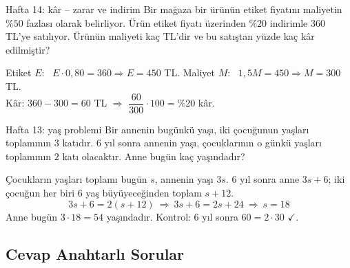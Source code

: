 \begin{karma}{Hafta 14: kâr -- zarar ve indirim}
Bir mağaza bir ürünün etiket fiyatını maliyetin \(\%50\) fazlası olarak belirliyor. Ürün etiket fiyatı üzerinden \(\%20\) indirimle \(360\) TL'ye satılıyor. Ürünün maliyeti kaç TL'dir ve bu satıştan yüzde kaç kâr edilmiştir?
\end{karma}
\begin{cozum}
Etiket \(E\): \ \(E\cdot 0{,}80=360\Rightarrow E=450\) TL. \quad Maliyet \(M\): \ \(1{,}5M=450\Rightarrow M=300\) TL.\\
Kâr: \(360-300=60\) TL \(\Rightarrow\) \(\dfrac{60}{300}\cdot 100=\%20\) kâr.
\end{cozum}

\begin{karma}{Hafta 13: yaş problemi}
Bir annenin bugünkü yaşı, iki çocuğunun yaşları toplamının \(3\) katıdır. \(6\) yıl sonra annenin yaşı, çocuklarının o günkü yaşları toplamının \(2\) katı olacaktır. Anne bugün kaç yaşındadır?
\end{karma}
\begin{cozum}
Çocukların yaşları toplamı bugün \(s\), annenin yaşı \(3s\). \(6\) yıl sonra anne \(3s+6\); iki çocuğun her biri \(6\) yaş büyüyeceğinden toplam \(s+12\).
\[3s+6=2(s+12)\ \Rightarrow\ 3s+6=2s+24\ \Rightarrow\ s=18\]
Anne bugün \(3\cdot 18=54\) yaşındadır. Kontrol: \(6\) yıl sonra \(60=2\cdot 30\) \(\checkmark\).
\end{cozum}

\subsection*{Cevap Anahtarlı Sorular}

